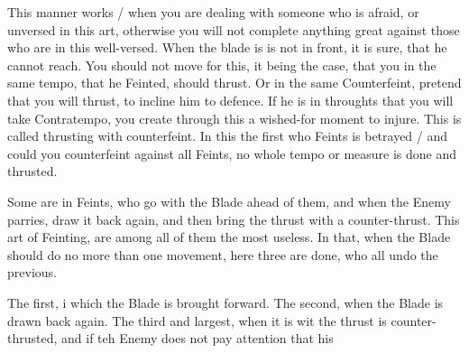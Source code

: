 
This manner works / when you are dealing with someone who is afraid,
or unversed in this art, otherwise you will not complete anything
great against those who are in this well-versed. When the blade is is
not in front, it is sure, that he cannot reach. You should not move
for this, it being the case, that you in the same tempo, that he
Feinted, should thrust. Or in the same Counterfeint, pretend that you
will thrust, to incline him to defence. If he is in throughts that you
will take Contratempo, you create through this a wished-for moment to
injure. This is called thrusting with counterfeint. In this the first
who Feints is betrayed / and could you counterfeint against all
Feints, no whole tempo or measure is done and thrusted.


Some are in Feints, who go with the Blade ahead of them, and when the
Enemy parries, draw it back again, and then bring the thrust with a
counter-thrust. This art of Feinting, are among all of them the most
useless. In that, when the Blade should do no more than one movement,
here three are done, who all undo the previous.


The first, i which the Blade is brought forward. The second, when the
Blade is drawn back again. The third and largest, when it is wit the
thrust is counter-thrusted, and if teh Enemy does not
pay attention that his